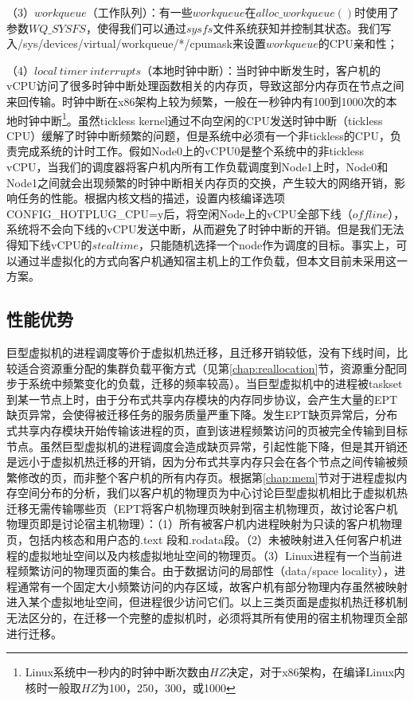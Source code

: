 （3）$workqueue$（工作队列）：有一些$workqueue$在$alloc\_workqueue()$时使用了参数$WQ\_SYSFS$，使得我们可以通过$sysfs$文件系统获知并控制其状态。我们写入/sys/devices/virtual/workqueue/*/cpumask来设置$workqueue$的CPU亲和性；

（4）$local\ timer\ interrupts$（本地时钟中断）：当时钟中断发生时，客户机的vCPU访问了很多时钟中断处理函数相关的内存页，导致这部分内存页在节点之间来回传输。时钟中断在x86架构上较为频繁，一般在一秒钟内有100到1000次的本地时钟中断\footnote{Linux系统中一秒内的时钟中断次数由$HZ$决定，对于x86架构，在编译Linux内核时一般取$HZ$为100，250，300，或1000}。虽然tickless kernel通过不向空闲的CPU发送时钟中断（tickless CPU）缓解了时钟中断频繁的问题，但是系统中必须有一个非tickless的CPU，负责完成系统的计时工作。假如Node0上的vCPU0是整个系统中的非tickless vCPU，当我们的调度器将客户机内所有工作负载调度到Node1上时，Node0和Node1之间就会出现频繁的时钟中断相关内存页的交换，产生较大的网络开销，影响任务的性能。根据内核文档的描述，设置内核编译选项CONFIG\_HOTPLUG\_CPU=y后，将空闲Node上的vCPU全部下线（$offline$），系统将不会向下线的vCPU发送中断，从而避免了时钟中断的开销。但是我们无法得知下线vCPU的$steal time$，只能随机选择一个node作为调度的目标。事实上，可以通过半虚拟化的方式向客户机通知宿主机上的工作负载，但本文目前未采用这一方案。

\subsection{性能优势}
巨型虚拟机的进程调度等价于虚拟机热迁移，且迁移开销较低，没有下线时间，比较适合资源重分配的集群负载平衡方式（见第\ref{chap:reallocation}节，资源重分配同步于系统中频繁变化的负载，迁移的频率较高）。当巨型虚拟机中的进程被taskset到某一节点上时，由于分布式共享内存模块的内存同步协议，会产生大量的EPT缺页异常，会使得被迁移任务的服务质量严重下降。发生EPT缺页异常后，分布式共享内存模块开始传输该进程的页，直到该进程频繁访问的页被完全传输到目标节点。虽然巨型虚拟机的进程调度会造成缺页异常，引起性能下降，但是其开销还是远小于虚拟机热迁移的开销，因为分布式共享内存只会在各个节点之间传输被频繁修改的页，而非整个客户机的所有内存页。根据第\ref{chap:mem}节对于进程虚拟内存空间分布的分析，我们以客户机的物理页为中心讨论巨型虚拟机相比于虚拟机热迁移无需传输哪些页（EPT将客户机物理页映射到宿主机物理页，故讨论客户机物理页即是讨论宿主机物理）：（1）所有被客户机内进程映射为只读的客户机物理页，包括内核态和用户态的.text 段和.rodata段。（2）未被映射进入任何客户机进程的虚拟地址空间以及内核虚拟地址空间的物理页。（3）Linux进程有一个当前进程频繁访问的物理页面的集合。由于数据访问的局部性（data/space locality），进程通常有一个固定大小频繁访问的内存区域，故客户机有部分物理内存虽然被映射进入某个虚拟地址空间，但进程很少访问它们。以上三类页面是虚拟机热迁移机制无法区分的，在迁移一个完整的虚拟机时，必须将其所有使用的宿主机物理页全部进行迁移。

